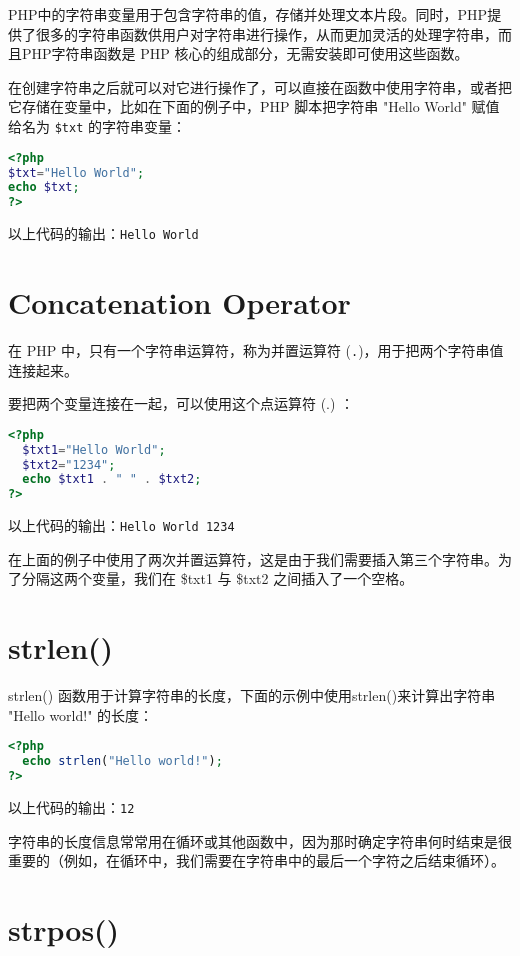 PHP中的字符串变量用于包含字符串的值，存储并处理文本片段。同时，PHP提供了很多的字符串函数供用户对字符串进行操作，从而更加灵活的处理字符串，而且PHP字符串函数是 PHP 核心的组成部分，无需安装即可使用这些函数。


在创建字符串之后就可以对它进行操作了，可以直接在函数中使用字符串，或者把它存储在变量中，比如在下面的例子中，PHP 脚本把字符串 "Hello World" 赋值给名为 \texttt{\$txt} 的字符串变量：


\begin{lstlisting}[language=PHP]
<?php
$txt="Hello World";
echo $txt;
?>
\end{lstlisting}


以上代码的输出：\verb|Hello World|


\section{Concatenation Operator}



在 PHP 中，只有一个字符串运算符，称为并置运算符 (\texttt{.})，用于把两个字符串值连接起来。

要把两个变量连接在一起，可以使用这个点运算符 (.) ：

\begin{lstlisting}[language=PHP]
<?php
  $txt1="Hello World";
  $txt2="1234";
  echo $txt1 . " " . $txt2;
?>
\end{lstlisting}


以上代码的输出：\verb|Hello World 1234|


在上面的例子中使用了两次并置运算符，这是由于我们需要插入第三个字符串。为了分隔这两个变量，我们在 \$txt1 与 \$txt2 之间插入了一个空格。


\section{strlen()}


strlen() 函数用于计算字符串的长度，下面的示例中使用strlen()来计算出字符串 "Hello world!" 的长度：

\begin{lstlisting}[language=PHP]
<?php
  echo strlen("Hello world!");
?>
\end{lstlisting}


以上代码的输出：\verb|12|

字符串的长度信息常常用在循环或其他函数中，因为那时确定字符串何时结束是很重要的（例如，在循环中，我们需要在字符串中的最后一个字符之后结束循环）。

\section{strpos()}

